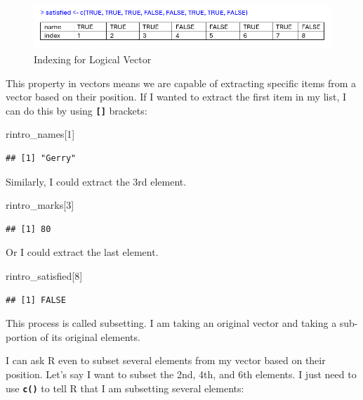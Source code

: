 \documentclass[
]{book}
\newenvironment{Shaded}{\begin{snugshade}}{\end{snugshade}}
\newcommand{\DecValTok}[1]{\textcolor[rgb]{0.00,0.00,0.81}{#1}}
\newcommand{\NormalTok}[1]{#1}
\begin{document}
\begin{figure}
\centering
\includegraphics{img/03-index-logical.png}
\caption{\label{fig:unnamed-chunk-69}Indexing for Logical Vector}
\end{figure}

This property in vectors means we are capable of extracting specific items from a vector based on their position. If I wanted to extract the first item in my list, I can do this by using \textbf{\texttt{{[}{]}}} brackets:

\begin{Shaded}
\begin{Highlighting}[]
\NormalTok{rintro\_names[}\DecValTok{1}\NormalTok{]}
\end{Highlighting}
\end{Shaded}

\begin{verbatim}
## [1] "Gerry"
\end{verbatim}

Similarly, I could extract the 3rd element.

\begin{Shaded}
\begin{Highlighting}[]
\NormalTok{rintro\_marks[}\DecValTok{3}\NormalTok{]}
\end{Highlighting}
\end{Shaded}

\begin{verbatim}
## [1] 80
\end{verbatim}

Or I could extract the last element.

\begin{Shaded}
\begin{Highlighting}[]
\NormalTok{rintro\_satisfied[}\DecValTok{8}\NormalTok{]}
\end{Highlighting}
\end{Shaded}

\begin{verbatim}
## [1] FALSE
\end{verbatim}

This process is called subsetting. I am taking an original vector and taking a sub-portion of its original elements.

I can ask R even to subset several elements from my vector based on their position. Let's say I want to subset the 2nd, 4th, and 6th elements. I just need to use \textbf{\texttt{c()}} to tell R that I am subsetting several elements:
\end{document}
